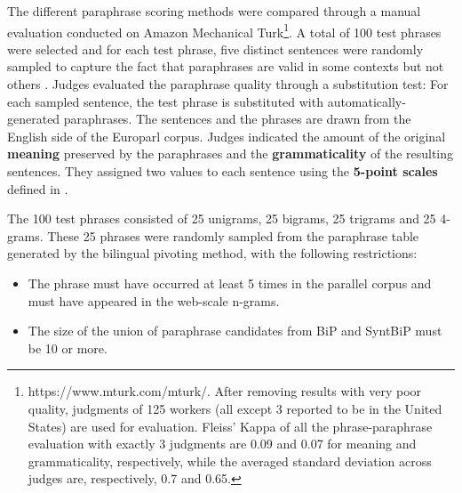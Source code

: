 \documentclass[11pt]{article}
\begin{document}
The different paraphrase scoring methods were compared through a manual evaluation conducted on Amazon Mechanical Turk\footnote{https://www.mturk.com/mturk/. After %
removing results with very poor quality, judgments of 125 workers (all except 3 reported to be in the United States) are used for evaluation. Fleiss' Kappa of all the phrase-paraphrase evaluation with exactly 3 judgments are 0.09 and 0.07 for meaning and grammaticality, respectively, %
while the averaged standard deviation across judges are, respectively, 0.7 and 0.65.}. A total of 100 test phrases were selected and for each test phrase, five distinct sentences were randomly sampled to capture the fact that paraphrases are valid in some contexts but not others \cite{Szpektor2007}.
%
Judges evaluated the paraphrase quality through a substitution test: For each sampled sentence, the test phrase is substituted with automatically-generated paraphrases.  The sentences and the phrases are drawn from the English side of the Europarl corpus.  %
Judges indicated the amount of the original {\bf meaning} preserved by the paraphrases and the {\bf grammaticality} of the resulting sentences.  They assigned two values to each sentence using the {\bf 5-point scales} defined in %
.

The 100 test phrases consisted of 25 unigrams, 25 bigrams, 25 trigrams and 25 4-grams.  These  25 phrases were randomly sampled from the paraphrase table generated by the bilingual pivoting method, with the following restrictions: 

\vspace{-.1cm}
\begin{itemize}
\vspace{-.1cm}
\item The phrase must have occurred at least 5 times in the parallel corpus and must have appeared in the web-scale n-grams.
\vspace{-.1cm}
\item The size of the union of paraphrase candidates from BiP and SyntBiP must be 10 or more.
\vspace{-.1cm}
\end{itemize}
\end{document}
